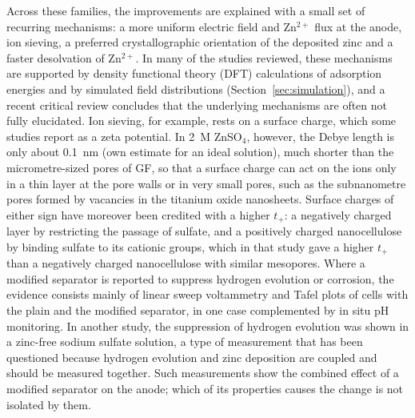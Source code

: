 Across these families, the improvements are explained with a small set of recurring mechanisms: a more uniform electric field and Zn$^{2+}$ flux at the anode, ion sieving, a preferred crystallographic orientation of the deposited zinc and a faster desolvation of Zn$^{2+}$\cite{gu_role_2025}.
In many of the studies reviewed, these mechanisms are supported by density functional theory (DFT) calculations of adsorption energies\cite{luo_regulating_2024,yuan_synergistic_2025} and by simulated field distributions (Section~\ref{sec:simulation}), and a recent critical review concludes that the underlying mechanisms are often not fully elucidated\cite{gu_role_2025}.
Ion sieving, for example, rests on a surface charge, which some studies report as a zeta potential\cite{tan_multiscale_2025,shao_selfrecognition_2025}.
In \SI{2}{M} ZnSO$_4$, however, the Debye length is only about \SI{0.1}{nm} (own estimate for an ideal solution), much shorter than the micrometre-sized pores of GF\cite{hansen_role_2023}, so that a surface charge can act on the ions only in a thin layer at the pore walls or in very small pores, such as the subnanometre pores formed by vacancies in the titanium oxide nanosheets\cite{tan_multiscale_2025}.
Surface charges of either sign have moreover been credited with a higher $t_+$: a negatively charged layer by restricting the passage of sulfate\cite{shao_selfrecognition_2025}, and a positively charged nanocellulose by binding sulfate to its cationic groups, which in that study gave a higher $t_+$ than a negatively charged nanocellulose with similar mesopores\cite{zhang_cationic_2023}.
Where a modified separator is reported to suppress hydrogen evolution or corrosion, the evidence consists mainly of linear sweep voltammetry and Tafel plots of cells with the plain and the modified separator\cite{zhao_separator_2024,shao_selfrecognition_2025}, in one case complemented by in situ pH monitoring\cite{shao_selfrecognition_2025}.
In another study, the suppression of hydrogen evolution was shown in a zinc-free sodium sulfate solution\cite{yuan_synergistic_2025}, a type of measurement that has been questioned because hydrogen evolution and zinc deposition are coupled and should be measured together\cite{rana_electroanalytical_2025}.
Such measurements show the combined effect of a modified separator on the anode; which of its properties causes the change is not isolated by them.

